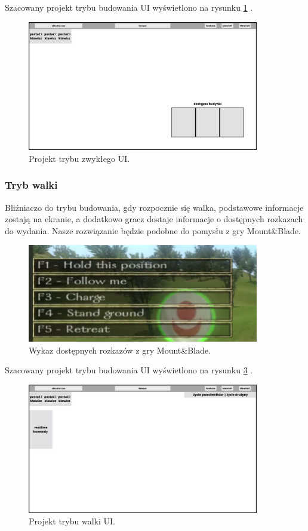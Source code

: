     Szacowany projekt trybu budowania UI wyświetlono na rysunku \ref{fig:ui_bud} .
    \begin{figure}[htbp]
        \centering
        \includegraphics[width=0.9\textwidth]{images/ui/ui_proj_budowanie.jpg}
        \caption{Projekt trybu zwykłego UI.
        }\label{fig:ui_bud}
    \end{figure}


\subsubsection{Tryb walki}
Bliźniaczo do trybu budowania, gdy rozpocznie się walka, podstawowe informacje zostają na ekranie, a dodatkowo gracz dostaje informacje o dostępnych rozkazach do wydania. Nasze rozwiązanie będzie podobne do pomysłu z gry Mount\&Blade.

\begin{figure}[h!tbp]
    \centering
    \includegraphics[width=0.9\textwidth]{images/ui/commandsMountBla.png}
    \caption{Wykaz dostępnych rozkazów z gry Mount\&Blade.}\label{fig:MountnBlade}
    \label{fig:mnb}
\end{figure}

Szacowany projekt trybu budowania UI wyświetlono na rysunku \ref{fig:ui_wal} .
    \begin{figure}[htbp]
        \centering
        \includegraphics[width=0.9\textwidth]{images/ui/ui_proj_walka.jpg}
        \caption{Projekt trybu walki UI.
        }\label{fig:ui_wal}
    \end{figure}
